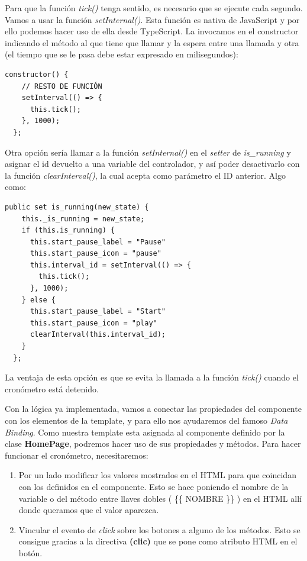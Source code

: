 Para que la función \emph{tick()} tenga sentido, es necesario que se ejecute cada segundo. Vamos a usar la función \emph{setInternal()}. Esta función es nativa de JavaScript y por ello podemos hacer uso de ella desde TypeScript. La invocamos en el constructor indicando el método al que tiene que llamar y la espera entre una llamada y otra (el tiempo que se le pasa debe estar expresado en milisegundos):

\begin{lstlisting}[style=htmlcssjs,frame=tlrb,xleftmargin={0.2cm}]
  constructor() {
    // RESTO DE FUNCIÓN
    setInterval(() => {
      this.tick();
    }, 1000);
  };
\end{lstlisting}

Otra opción sería llamar a la función \emph{setInternal()} en el \emph{setter} de \emph{is\_running} y asignar el id devuelto a una variable del controlador, y así poder desactivarlo con la función \emph{clearInterval()}, la cual acepta como parámetro el ID anterior. Algo como:


\begin{lstlisting}[style=htmlcssjs,frame=tlrb,xleftmargin={0.2cm}]
  public set is_running(new_state) {
    this._is_running = new_state;
    if (this.is_running) {
      this.start_pause_label = "Pause"
      this.start_pause_icon = "pause"
      this.interval_id = setInterval(() => {
        this.tick();
      }, 1000);
    } else {
      this.start_pause_label = "Start"
      this.start_pause_icon = "play"
      clearInterval(this.interval_id);
    }
  };
\end{lstlisting}

La ventaja de esta opción es que se evita la llamada a la función \emph{tick()} cuando el cronómetro está detenido.

Con la lógica ya implementada, vamos a conectar las propiedades del componente con los elementos de la template, y para ello nos ayudaremos del famoso \emph{Data Binding}. Como nuestra template esta asignada al componente definido por la clase \textbf{HomePage}, podremos hacer uso de sus propiedades y métodos. Para hacer funcionar el cronómetro, necesitaremos:

\begin{enumerate}
  \item Por un lado modificar los valores mostrados en el \gls{HTML} para que coincidan con los definidos en el componente. Esto se hace poniendo el nombre de la variable o del método entre llaves dobles ( \{\{ NOMBRE \}\} ) en el \gls{HTML} allí donde queramos que el valor aparezca.
  \item Vincular el evento de \emph{click} sobre los botones a alguno de los métodos. Esto se consigue gracias a la directiva \textbf{(clic)} que se pone como atributo \gls{HTML} en el botón.
\end{enumerate}

